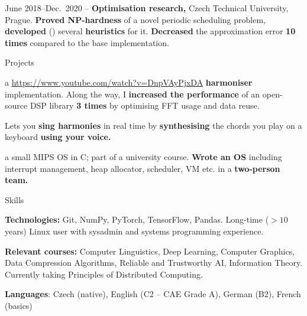 {\csc June 2018–Dec.~2020} –
{\bf Optimisation research,}
{\I %
Czech Technical University, Prague.}
%
%
\: {\bf Proved NP-hardness} of a novel periodic scheduling problem, {\bf
developed} (\Cpp) several {\bf heuristics} for it.
\:
{\bf Decreased} the approximation error {\bf 10 times} compared to the base implementation.

\endlist

\vskip -3mm

\sekce Projects

%
a \Cpp{} \url{https://www.youtube.com/watch?v=DnpVAyPjxDA}{{\bf
harmoniser}} implementation.
\: Along the way, I {\bf increased the performance} of an
open-source DSP library {\bf 3 times} by optimising FFT usage and data reuse.

\: Lets you {\bf sing harmonies} in real time by {\bf synthesising} the
chords you play on a keyboard {\bf using your voice.}
\endlist

 a small MIPS OS in C; part of a university course.
%
\: {\bf Wrote an OS} including interrupt management, heap allocator,
scheduler, VM etc. in a {\bf two-person team.}
\endlist


\sekce Skills
 

{\bf Technologies:} {\af Git}, {\af NumPy}, {\af PyTorch}, {\af TensorFlow},
{\af Pandas}. Long-time ($> 10$ years) Linux user with sysadmin and systems
programming experience.

\smallskip

{\bf Relevant courses:} Computer Linguistics, Deep Learning, Computer Graphics,
Data Compression Algorithms, Reliable and Trustworthy AI, Information
Theory. Currently taking Principles of Distributed Computing.

\smallskip

{\bf Languages}: Czech (native), English (C2 -- CAE Grade A), German (B2), French (basics)


